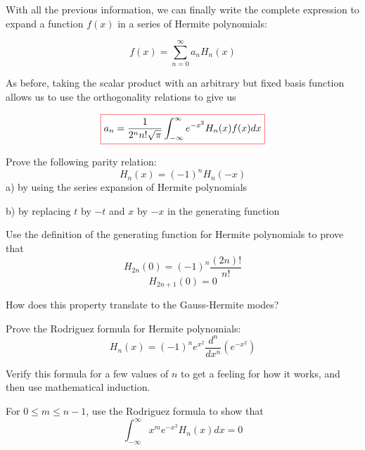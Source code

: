 
With all the previous information, we can finally write the complete expression to expand a function $f(x)$ in a series of Hermite polynomials:

\begin{equation}
f(x) = \sum_{n=0}^{\infty}a_n H_n(x)
\end{equation} 

As before, taking the scalar product with an arbitrary but fixed basis function allows us to use the orthogonality relations to give us

\begin{equation}
\fbox{$\displaystyle
a_n = \frac{1}{2^n n!\sqrt{\pi}} \int_{-\infty}^{\infty} e^{-x^2} H_n(x) f(x) dx
$}
\end{equation} 


\pagebreak
\begin{exer}
  
Prove the following parity relation:
$$H_n(x) = (-1)^nH_n(-x)$$
a) by using the series expansion of Hermite polynomials

b) by replacing $t$ by $-t$ and $x$ by $-x$ in the generating function
\end{exer}


\begin{exer}
Use the definition of the generating function for Hermite polynomials to prove that
$$H_{2n}(0) = (-1)^n \frac{(2n)!}{n!}$$
$$H_{2n+1}(0) = 0$$

How does this property translate to the Gauss-Hermite modes?

\end{exer}

\begin{exer}
Prove the Rodriguez formula for Hermite polynomials:
$$H_n(x) = (-1)^n e^{x^2}\frac{d^n}{d x^n}\left(e^{-x^2}\right)$$
\begin{hnt}
Verify this formula for a few values of $n$ to get a feeling for how it works, and then use mathematical induction.
\end{hnt}  
\end{exer}

\begin{exer}
For $0 \leq m \leq n-1$, use the Rodriguez formula to show that 
$$\int_{-\infty}^{\infty}x^m e^{-x^2} H_n(x) dx = 0$$
\end{exer}

